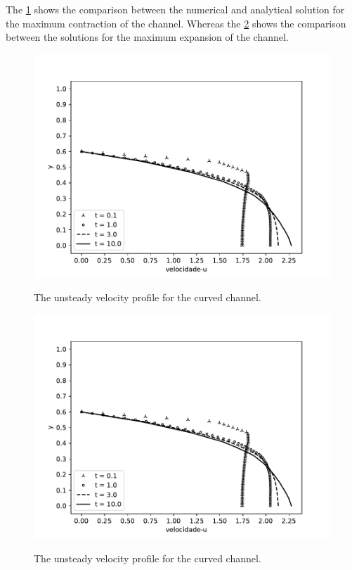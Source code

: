 \medskip
The \ref{contraction velocity} shows the comparison between the 
numerical and analytical solution for the maximum contraction 
of the channel. Whereas the \ref{expansion velocity} 
shows the comparison between the solutions for 
the maximum expansion of the channel.

\begin{figure}[H]
     \centering
     \includegraphics[scale=1]{./02_chaps/cap_solution/figure/vel_Curved_evol.pdf}\\
     \caption{The unsteady velocity profile for the curved channel.}
     \label{contraction velocity}
\end{figure}


\begin{figure}[H]
     \centering
     \includegraphics[scale=1]{./02_chaps/cap_solution/figure/vel_Curved_evol.pdf}\\
     \caption{The unsteady velocity profile for the curved channel.}
     \label{expansion velocity}
\end{figure}




\newpage
